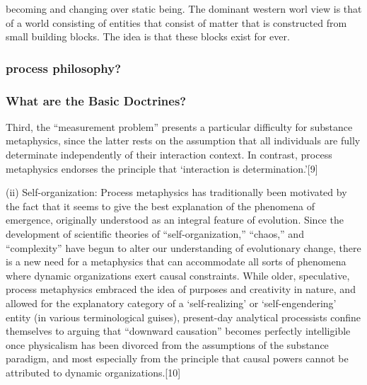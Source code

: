 becoming and changing over static being. The dominant western worl view is that of a world consisting of entities that consist of matter that is constructed from small building blocks. The idea is that these blocks exist for ever.

\subsubsection{process philosophy?}
\subsubsection{What are the Basic Doctrines?}
Third, the “measurement problem” presents a particular difficulty for substance metaphysics, since the latter rests on the assumption that all individuals are fully determinate independently of their interaction context. In contrast, process metaphysics endorses the principle that ‘interaction is determination.’[9]

(ii) Self-organization: Process metaphysics has traditionally been motivated by the fact that it seems to give the best explanation of the phenomena of emergence, originally understood as an integral feature of evolution. Since the development of scientific theories of “self-organization,” “chaos,” and “complexity” have begun to alter our understanding of evolutionary change, there is a new need for a metaphysics that can accommodate all sorts of phenomena where dynamic organizations exert causal constraints. While older, speculative, process metaphysics embraced the idea of purposes and creativity in nature, and allowed for the explanatory category of a ‘self-realizing’ or ‘self-engendering’ entity (in various terminological guises), present-day analytical processists confine themselves to arguing that “downward causation” becomes perfectly intelligible once physicalism has been divorced from the assumptions of the substance paradigm, and most especially from the principle that causal powers cannot be attributed to dynamic organizations.[10]

